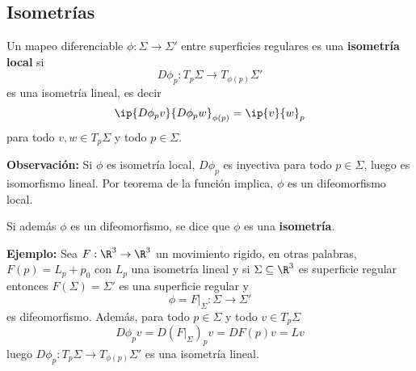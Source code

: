 \documentclass{article}
\begin{document}
\subsection{Isometrías}
\begin{dfn}
    Un mapeo diferenciable $\phi:\Sigma\to\Sigma'$ entre superficies regulares es una 
    \textbf{isometría local} si
    \begin{equation*}
        D\phi_{p}:T_{p}\Sigma\to T_{\phi(p)}\Sigma'
    \end{equation*}
    es una isometría lineal, es decir
    \begin{equation*}
        \ip{D\phi_{p}v}{D\phi_{p}w}_{\phi(p)}=\ip{v}{w}_{p}
    \end{equation*}
    para todo $v,w\in T_{p}\Sigma$ y todo $p\in\Sigma$.
\end{dfn}
\noindent\textbf{Observación:} Si $\phi$ es isometría local, $D\phi_{p}$ es inyectiva para todo 
$p\in\Sigma$, luego es isomorfismo lineal. Por teorema de la función implica, $\phi$ es un 
difeomorfismo local.

\vspace{4mm}
\noindent Si además $\phi$ es un difeomorfismo, se dice que $\phi$ es una \textbf{isometría}.

\vspace{4mm}
\noindent\textbf{Ejemplo:} Sea $F:\R^{3}\to\R^{3}$ un movimiento rigido, en otras palabras, 
$F(p)=L_{p}+p_{0}$ con $L_{p}$ una isometría lineal y si $\Sigma\subseteq\R^{3}$ es superficie 
regular entonces $F(\Sigma)=\Sigma'$ es una superficie regular y
\begin{equation*}
    \phi=F\Big|_{\Sigma}:\Sigma\to\Sigma'
\end{equation*}
es difeomorfismo. Además, para todo $p\in\Sigma$ y todo $v\in T_{p}\Sigma$
\begin{equation*}
    D\phi_{p}v=D(F\Big|_{\Sigma})_{p}v=DF(p)v=Lv
\end{equation*}
luego $D\phi_{p}:T_{p}\Sigma\to T_{\phi(p)}\Sigma'$ es una isometría lineal.

\end{document}
